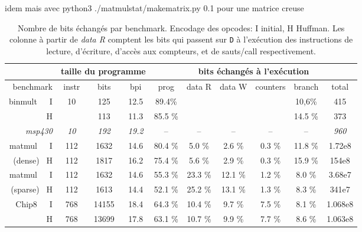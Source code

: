 \documentclass[architecture]{compas2018}
\begin{document}
idem mais avec python3 ./matmulstat/makematrix.py 0.1 pour une matrice creuse

\fi


\begin{table}
  \centering
  \begin{tabular}{|r||c|c|c||c|c|c|c|c||c|}
    \hline
    & \multicolumn{3}{c||}{taille du programme} & \multicolumn{6}{c|}{bits échangés à l'exécution}                    \\
    \hline

    
    benchmark      & instr     & bits       & bpi         & prog    & data R  & data W  & counters & branch  & total      \\
    \hline
    \hline
    binmult~~~I    & 10        & 125        & 12.5        & 89.4\%  &         &         &          & 10,6\%  & 415        \\
     H             &           & 113        & 11.3        & 85.5 \% &         &         &          & 14.5 \% & 373        \\
    \emph{ msp430} & \emph{10} & \emph{192} & \emph{19.2} & --      & --      & --      & --       & --      & \emph{960} \\
    \hline
    \hline
    matmul~~~I     & 112       & 1632       & 14.6        & 80.4 \% & 5.0 \%  & 2.6 \%  & 0.3 \%   & 11.8 \% & 1.72e8     \\ 
     (dense)~  H           & 112       & 1817       & 16.2        & 75.4 \% & 5.6 \%  & 2.9 \%  & 0.3 \%   & 15.9 \% & 154e8      \\ 
    \hline
    matmul~~~I    & 112       & 1632       & 14.6        & 55.3 \% & 23.3 \% & 12.1 \% & 1.2 \%   & 8.0 \%  & 3.68e7     \\ 

    (sparse)~ H & 112 & 1613 & 14.4  & 52.1 \% & 25.2 \% & 13.1 \% & 1.3 \% & 8.3 \% & 341e7\\ 

    \hline
    \hline
    Chip8~~~I     & 768 & 14155 & 18.4 &  64.3 \% & 10.4 \% & 9.7 \% & 7.5 \% & 8.1 \% & 1.068e8       \\
     H    & 768 & 13699 & 17.8 & 63.1 \% & 10.7 \% & 9.9 \% & 7.7 \% & 8.6 \% & 1.063e8\\ 
    \hline
  \end{tabular}
  \caption{Nombre de bits échangés par benchmark. Encodage des opcodes: I initial, H Huffman. Les colonne à partir de \emph{data R} comptent  les bits qui passent sur \texttt{D} à l'exécution des instructions de lecture, d'écriture, d'accès aux compteurs, et de sauts/call  respectivement. }
  \label{tab:bitcounts}
\end{table}
\end{document}
